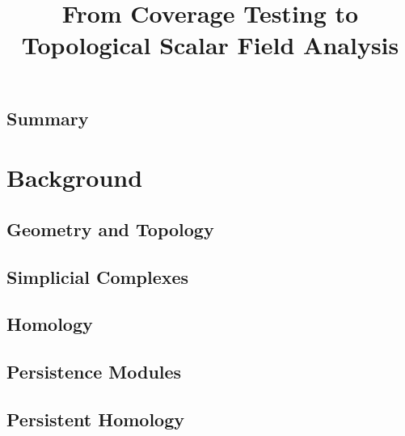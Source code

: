 \documentclass[12pt]{article}
\begin{document}
\title{From Coverage Testing to Topological Scalar Field Analysis}
\maketitle



\subsection{Summary}


\clearpage
\section{Background}

\subsection{Geometry and Topology}
  

\subsection{Simplicial Complexes}\label{sec:complexes}
  
%
%
\subsection{Homology}\label{sec:homology}
  
%
\subsection{Persistence Modules}
  
%
\subsection{Persistent Homology}
  
\end{document}
